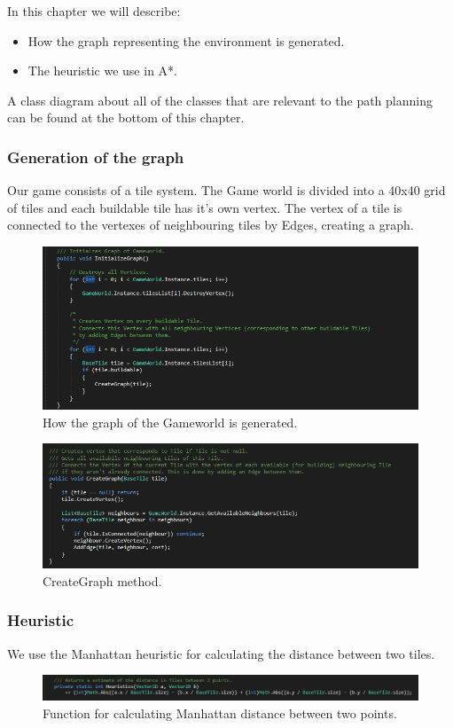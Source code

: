 In this chapter we will describe: 
\begin{itemize}
	\item How the graph representing the environment is generated.
	\item The heuristic we use in A*.
\end{itemize}
A class diagram about all of the classes that are relevant to the path planning can be found at the bottom of this chapter.
\subsubsection{Generation of the graph}
Our game consists of a tile system. The Game world is divided into a 40x40 grid of tiles and each buildable tile has it's own vertex. The vertex of a tile is connected to the vertexes of neighbouring tiles by Edges, creating a graph.
\begin{figure}[H]
	\centering
	\includegraphics[width=\linewidth]{Images/graphgeneration1}
	\caption{How the graph of the Gameworld is generated.}
	\label{fig:graphgeneration1}
\end{figure} 
\begin{figure}[H]
	\centering
	\includegraphics[width=1\linewidth]{Images/graphgeneration2}
	\caption{CreateGraph method.}
	\label{fig:graphgeneration2}
\end{figure} 
\subsubsection{Heuristic}
We use the Manhattan heuristic for calculating the distance between two tiles.
\begin{figure}[H]
	\centering
	\includegraphics[width=1\linewidth]{Images/heuristics}
	\caption{Function for calculating Manhattan distance between two points.}
	\label{fig:heuristics}
\end{figure} 
